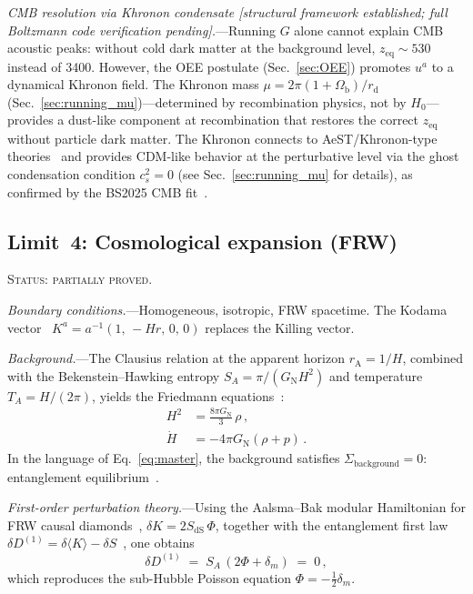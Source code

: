 \documentclass[prd,twocolumn,superscriptaddress,longbibliography,floatfix]{revtex4-2}
\newcommand{\GN}{G_{\mathrm{N}}}
\newcommand{\SdS}{S_{\mathrm{dS}}}
\newcommand{\rA}{r_{\mathrm{A}}}
\begin{document}
\emph{CMB resolution via Khronon condensate
[structural framework established; full Boltzmann code
verification pending].}---Running $G$ alone cannot
explain CMB acoustic peaks: without cold dark matter at
the background level, $z_{\mathrm{eq}} \sim 530$ instead
of 3400.  However, the OEE postulate
(Sec.~\ref{sec:OEE}) promotes $u^a$ to a dynamical
Khronon field.  The Khronon mass
$\mu = 2\pi(1+\Omega_{\mathrm{b}})/r_{\mathrm{d}}$
(Sec.~\ref{sec:running_mu})---determined by
recombination physics, not by $H_0$---provides a
dust-like component at recombination that restores
the correct $z_{\mathrm{eq}}$ without particle dark
matter.  The Khronon connects to
AeST/Khronon-type
theories~\cite{SkordisZlosnik2021,BlanchetSkordis2024}
and provides CDM-like behavior at the perturbative
level via the ghost condensation condition $c_s^2 = 0$
(see Sec.~\ref{sec:running_mu} for details), as
confirmed by the BS2025 CMB fit~\cite{BS2025}.


\subsection{Limit~4: Cosmological expansion (FRW)}
\label{sec:limit_cosmo}

\textsc{Status: partially proved.}

\emph{Boundary conditions.}---Homogeneous, isotropic,
FRW spacetime.  The Kodama vector~\cite{Kodama1980}
$K^a = a^{-1}(1,\,-Hr,\,0,\,0)$ replaces the Killing
vector.

\emph{Background.}---The Clausius relation at the apparent
horizon $\rA = 1/H$, combined with the
Bekenstein--Hawking entropy $S_A = \pi/(\GN H^2)$ and
temperature $T_A = H/(2\pi)$, yields the Friedmann
equations~\cite{CaiKim2005,Jacobson1995}:
\begin{align}
H^2 &= \frac{8\pi\GN}{3}\,\rho\,,
\label{eq:friedmann1}\\
\dot{H} &= -4\pi\GN(\rho + p)\,.
\label{eq:friedmann2}
\end{align}
In the language of Eq.~\eqref{eq:master}, the background
satisfies $\Sigma_{\mathrm{background}} = 0$:
entanglement equilibrium~\cite{Jacobson2016}.

\emph{First-order perturbation theory.}---Using the
Aalsma--Bak modular Hamiltonian for FRW causal
diamonds~\cite{AalsmaBak2025},
$\delta K = 2\SdS\,\Phi$, together with the entanglement
first law $\delta D^{(1)} = \delta\langle K\rangle
- \delta S$~\cite{Faulkner2014}, one obtains
\begin{equation}
\delta D^{(1)} \;=\; S_A\,(2\Phi + \delta_m) \;=\; 0\,,
\label{eq:first_order_D}
\end{equation}
which reproduces the sub-Hubble Poisson equation
$\Phi = -\tfrac{1}{2}\delta_m$.
\end{document}
